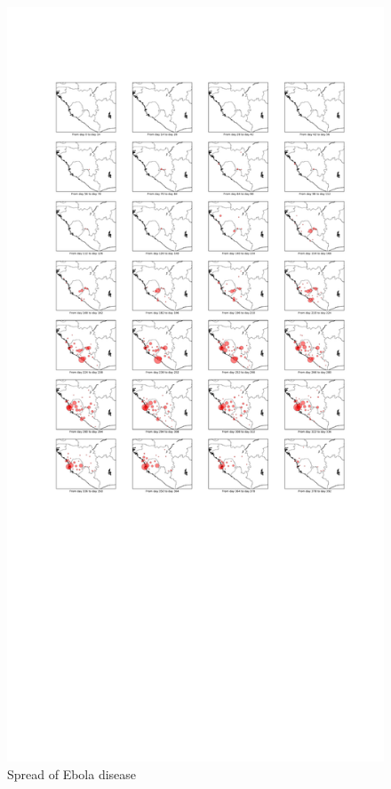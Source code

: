 \documentclass[12pt]{article}
\begin{document}
\begin{figure}%
\begin{center}
  \includegraphics[width=6.1in]{graph/spread.pdf}
  \caption{Spread of Ebola disease}
  \label{spread}
\end{center}  
\end{figure}
\end{document}
